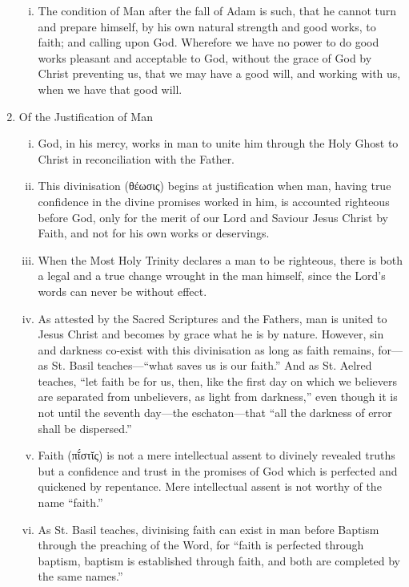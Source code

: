 \begin{enumerate}
	\begin{enumerate}[i.]
		\item The condition of Man after the fall of Adam is such, that he cannot turn and prepare himself, by his own natural strength and good works, to faith; and calling upon God. Wherefore we have no power to do good works pleasant and acceptable to God, without the grace of God by Christ preventing us, that we may have a good will, and working with us, when we have that good will.
	\end{enumerate}
	\item Of the Justification of Man
	\begin{enumerate}[i.]
		\item God, in his mercy, works in man to unite him through the Holy Ghost to Christ in reconciliation with the Father.
		\item This divinisation (θέωσις) begins at justification when man, having true confidence in the divine promises worked in him, is accounted righteous before God, only for the merit of our Lord and Saviour Jesus Christ by Faith, and not for his own works or deservings.
		\item When the Most Holy Trinity declares a man to be righteous, there is both a legal and a true change wrought in the man himself, since the Lord's words can never be without effect.
		\item As attested by the Sacred Scriptures and the Fathers, man is united to Jesus Christ and becomes by grace what he is by nature. However, sin and darkness co-exist with this divinisation as long as faith remains, for---as St. Basil teaches---``what saves us is our faith.'' And as St. Aelred teaches, ``let faith be for us, then, like the first day on which we believers are separated from unbelievers, as light from darkness,'' even though it is not until the seventh day---the eschaton---that ``all the darkness of error shall be dispersed.''
		\item Faith (πῐ́στῐς) is not a mere intellectual assent to divinely revealed truths but a confidence and trust in the promises of God which is perfected and quickened by repentance. Mere intellectual assent is not worthy of the name ``faith.''
		\item As St. Basil teaches, divinising faith can exist in man before Baptism through the preaching of the Word, for ``faith is perfected through baptism, baptism is established through faith, and both are completed by the same names.''

\end{enumerate}
\end{enumerate}
